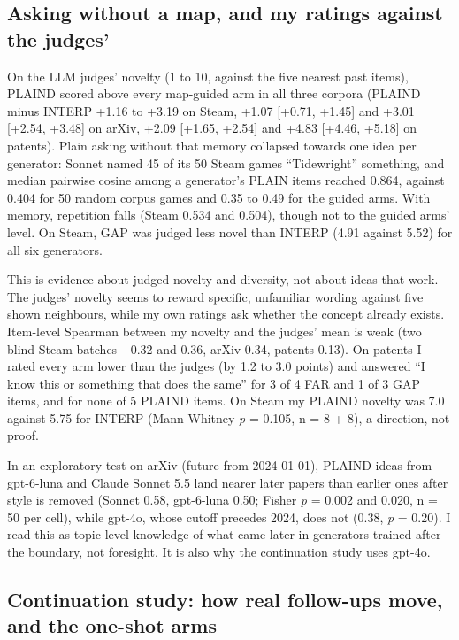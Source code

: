 \documentclass[
  10pt,
]{article}
\begin{document}
\subsection{Asking without a map, and my ratings against the judges'}\label{app:A.7}

On the LLM judges' novelty (1 to 10,
against the five nearest past items),
PLAIND scored above every map-guided arm
in all three corpora (PLAIND minus
INTERP +1.16 to +3.19 on Steam, +1.07
{[}+0.71, +1.45{]} and +3.01 {[}+2.54,
+3.48{]} on arXiv, +2.09 {[}+1.65,
+2.54{]} and +4.83 {[}+4.46, +5.18{]} on
patents). Plain asking without that
memory collapsed towards one idea per
generator: Sonnet named 45 of its 50
Steam games ``Tidewright'' something,
and median pairwise cosine among a
generator's PLAIN items reached 0.864,
against 0.404 for 50 random corpus games
and 0.35 to 0.49 for the guided arms.
With memory, repetition falls (Steam
0.534 and 0.504), though not to the
guided arms' level. On Steam, GAP was
judged less novel than INTERP (4.91
against 5.52) for all six generators.

This is evidence about judged novelty
and diversity, not about ideas that
work. The judges' novelty seems to
reward specific, unfamiliar wording
against five shown neighbours, while my
own ratings ask whether the concept
already exists. Item-level Spearman
between my novelty and the judges' mean
is weak (two blind Steam batches −0.32
and 0.36, arXiv 0.34, patents 0.13). On
patents I rated every arm lower than the
judges (by 1.2 to 3.0 points) and
answered ``I know this or something that
does the same'' for 3 of 4 FAR and 1 of
3 GAP items, and for none of 5 PLAIND
items. On Steam my PLAIND novelty was
7.0 against 5.75 for INTERP
(Mann-Whitney \emph{p} = 0.105, n = 8 +
8), a direction, not proof.

In an exploratory test on arXiv (future
from 2024-01-01), PLAIND ideas from
gpt-6-luna and Claude Sonnet 5.5 land
nearer later papers than earlier ones
after style is removed (Sonnet 0.58,
gpt-6-luna 0.50; Fisher \emph{p} = 0.002
and 0.020, n = 50 per cell), while
gpt-4o, whose cutoff precedes 2024, does
not (0.38, \emph{p} = 0.20). I read this
as topic-level knowledge of what came
later in generators trained after the
boundary, not foresight. It is also why
the continuation study uses gpt-4o.

\subsection{Continuation study: how real follow-ups move, and the one-shot arms}\label{app:A.8}
\end{document}
